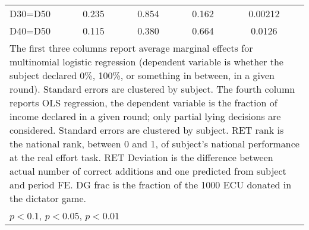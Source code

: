 \begin{tabular}{l|cccccc|cc}
D30=D50         &    0.235         &         &    0.854         &         &    0.162         &         &  0.00212         &         \\
D40=D50         &    0.115         &         &    0.380         &         &    0.664         &         &   0.0126         &         \\
\hline\hline
\multicolumn{9}{p{16cm}}{\tiny The first three columns report average marginal effects for multinomial logistic regression (dependent variable is whether the subject declared 0\%, 100\%, or something in between, in a given round). Standard errors are clustered by subject. The fourth column reports OLS regression, the dependent variable is the fraction of income declared in a given round; only partial lying decisions are considered. Standard errors are clustered by subject. RET rank is the national rank, between 0 and 1, of subject's national performance at the real effort task. RET Deviation is the difference between actual number of correct additions and one predicted from subject and period FE. DG frac is the fraction of the 1000 ECU donated in the dictator game.}\\
\multicolumn{9}{l}{\tiny \sym{*} \(p<0.1\), \sym{**} \(p<0.05\), \sym{***} \(p<0.01\)}\\
\end{tabular}